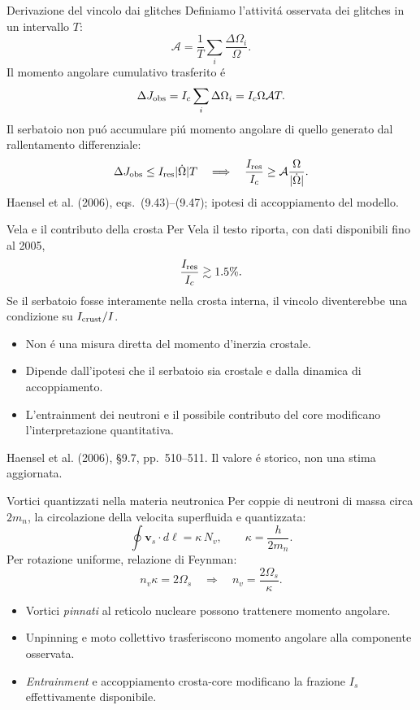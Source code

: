 \begin{frame}[t]{Derivazione del vincolo dai glitches}
\small
Definiamo l'attivit\'a osservata dei glitches in un intervallo $T$:
\[
\mathcal A=\frac1T\sum_i\frac{\Delta\Omega_i}{\Omega}.
\]
Il momento angolare cumulativo trasferito \'e
\[
\Delta J_{\rm obs}=I_c\sum_i\Delta\Omega_i
=I_c\Omega\mathcal A T.
\]
Il serbatoio non pu\'o accumulare pi\'u momento angolare di quello generato dal rallentamento differenziale:
\[
\Delta J_{\rm obs}\le I_{\rm res}|\dot\Omega|T
\quad\Longrightarrow\quad
\frac{I_{\rm res}}{I_c}\ge\mathcal A\frac{\Omega}{|\dot\Omega|}.
\]
\footnotesize Haensel et al. (2006), eqs.~(9.43)--(9.47); ipotesi di accoppiamento del modello.
\end{frame}

\begin{frame}[t]{Vela e il contributo della crosta}
\small
Per Vela il testo riporta, con dati disponibili fino al 2005,
\[
\frac{I_{\rm res}}{I_c}\gtrsim 1.5\%.
\]
Se il serbatoio fosse interamente nella crosta interna, il vincolo diventerebbe una condizione su $I_{\rm crust}/I$.
\begin{itemize}
\item Non \'e una misura diretta del momento d'inerzia crostale.
\item Dipende dall'ipotesi che il serbatoio sia crostale e dalla dinamica di accoppiamento.
\item L'entrainment dei neutroni e il possibile contributo del core modificano l'interpretazione quantitativa.
\end{itemize}
\footnotesize Haensel et al. (2006), \S9.7, pp.~510--511. Il valore \'e storico, non una stima aggiornata.
\end{frame}

\begin{frame}[t]{Vortici quantizzati nella materia neutronica}
\small
Per coppie di neutroni di massa circa $2m_n$, la circolazione della velocita superfluida e quantizzata:
\[
\oint\mathbf v_s\cdot d\boldsymbol\ell=
\kappa\,N_v,\qquad
\kappa=\frac h{2m_n}.
\]
Per rotazione uniforme, relazione di Feynman:
\[
n_v\kappa=2\Omega_s
\quad\Rightarrow\quad
n_v=\frac{2\Omega_s}{\kappa}.
\]
\begin{itemize}
\item Vortici \emph{pinnati} al reticolo nucleare possono trattenere momento angolare.
\item Unpinning e moto collettivo trasferiscono momento angolare alla componente osservata.
\item \emph{Entrainment} e accoppiamento crosta-core modificano la frazione $I_s$ effettivamente disponibile.
\end{itemize}
\end{frame}

